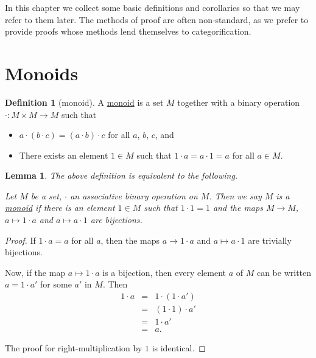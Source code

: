 \documentclass[a4paper]{report}
\newcommand{\defn}[1]{\ul{#1}}
\theoremstyle{definition}
\newtheorem{definition}{Definition}[section]
\theoremstyle{plain}
\newtheorem{lemma}{Lemma}[section]
\theoremstyle{remark}
\begin{document}
In this chapter we collect some basic definitions and corollaries so that we may refer to them later. The methods of proof are often non-standard, as we prefer to provide proofs whose methods lend themselves to categorification.
\section{Monoids}
\begin{definition}[monoid]
  \label{def:monoid}
  A \defn{monoid} is a set $M$ together with a binary operation $\cdot\colon M \times M \to M$ such that
  \begin{itemize}
    \item $a \cdot (b \cdot c)=(a \cdot b) \cdot c$ for all $a$, $b$, $c$, and
    \item There exists an element $1 \in M$ such that $1 \cdot a=a \cdot 1=a$ for all $a \in M$.
  \end{itemize}
\end{definition}

\begin{lemma}
  \label{lemma:monoidalmultiplicationbyunitbijective}
  The above definition is equivalent to the following.

  Let $M$ be a set, $\cdot$ an associative binary operation on $M$. Then we say $M$ is a \defn{monoid} if there is an element $1 \in M$ such that $1\cdot 1 = 1$ and the maps $M \to M$, $a \mapsto 1 \cdot a$ and $ a \mapsto a \cdot 1$ are bijections.
\end{lemma}
\begin{proof}
  If $1 \cdot a = a$ for all $a$, then the maps $a \to 1\cdot a$ and $a \mapsto a \cdot 1$ are trivially bijections.

  Now, if the map $a \mapsto 1 \cdot a$ is a bijection, then every element $a$ of $M$ can be written $a = 1 \cdot a'$ for some $a'$ in $M$. Then
  \begin{eqnarray*}
    1 \cdot a &=& 1 \cdot (1 \cdot a') \\
    &=& (1 \cdot 1) \cdot a' \\
    &=& 1 \cdot a' \\
    &=& a.
  \end{eqnarray*}

  The proof for right-multiplication by $1$ is identical.
\end{proof}
\end{document}
